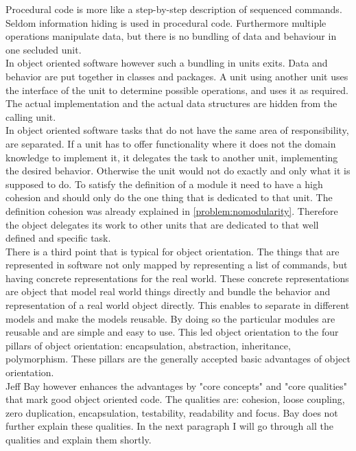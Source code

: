 Procedural code is more like a step-by-step description of sequenced commands. 	Seldom information hiding is used in procedural code. Furthermore multiple operations manipulate data, but there is no bundling of data and behaviour in one secluded unit. \\

In object oriented software however such a bundling in units exits. Data and behavior are put together in classes and packages. A unit using another unit uses the interface of the unit to determine possible operations, and uses it as required. The actual implementation and the actual data structures are hidden from the calling unit.\\
 
In object oriented software tasks that do not have the same area of responsibility, are separated. If a unit has to offer functionality where it does not the domain knowledge to implement it, it delegates the task to another unit, implementing the desired behavior. Otherwise the unit would not do exactly and only what it is supposed to do. To satisfy the definition of a module it need to have a high cohesion and should only do the one thing that is dedicated to that unit. The definition cohesion was already explained in \ref{problem:nomodularity}. Therefore the object delegates its work to other units that are dedicated to that well defined and specific task. \\
There is a third point that is typical for object orientation. The things that are represented in software not only mapped by representing a list of commands, but having concrete representations for the real world. These concrete representations are object that model real world things directly and bundle the behavior and representation of a real world object directly. 
This enables to separate in different models and make the models reusable. By doing so the particular modules are reusable and are simple and easy to use. 
This led object orientation to the four pillars of object orientation: encapsulation, abstraction, inheritance, polymorphism. These pillars are the generally accepted basic advantages of object orientation. \\

Jeff Bay however enhances the advantages by "core concepts" and "core qualities" that mark good object oriented code. The qualities are: cohesion, loose coupling, zero duplication, encapsulation, testability, readability and focus.
Bay does not further explain these qualities. In the next paragraph I will go through all the qualities and explain them shortly. \\

